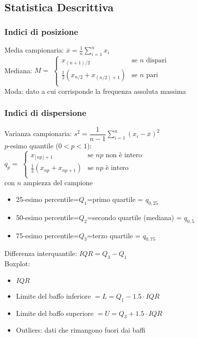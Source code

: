 \documentclass[10pt,a4paper]{article}
\begin{document}
\begin{multicols}{2}
\subsection*{Statistica Descrittiva}

\subsubsection*{Indici di posizione}
Media campionaria:
$\overline{x}=\frac{1}{n} \sum_{i=1}^n x_i$\\
Mediana:
$M=$ 
$\begin{cases}
    x_{(n+1)/2} & \text{se } n \text{ dispari} \\
    \frac{1}{2} \left( x_{n/2} + x_{(n/2)+1}\right) & \text{se } n \text{ pari} \\
\end{cases} $ \\
Moda: dato a cui corrisponde la frequenza assoluta massima

\subsubsection*{Indici di dispersione}

Varianza campionaria:
$s^2=\dfrac{1}{n-1} \sum_{i=1}^n (x_i-\overline{x})^2$\\
$p$-esimo quantile ($0<p<1$): \\ $q_p=$
$\begin{cases}
    x_{\lfloor np \rfloor + 1 } & \text{se } np \text{ non è intero} \\
    \frac{1}{2} \left( x_{np} + x_{np + 1}\right) & \text{se } np \text{ è intero} \\
\end{cases} $ \\
con $n$ ampiezza del campione
\begin{itemize}
    \item 25-esimo percentile=$Q_1$=primo quartile = $q_{0,25}$
    \item 50-esimo percentile=$Q_2$=secondo quartile (mediana) = $q_{0,5}$
    \item 75-esimo percentile=$Q_3$=terzo quartile = $q_{0,75}$
\end{itemize}
Differenza interquantile: $IQR=Q_3-Q_1$\\
Boxplot: 
\begin{itemize}
    \item $IQR$
    \item Limite del baffo inferiore $= L = Q_1-1.5 \cdot  IQR$
    \item Limite del baffo superiore $= U = Q_3+1.5 \cdot  IQR$
    \item Outliers: dati che rimangono fuori dai baffi
\end{itemize}
 

\end{multicols}
\end{document}
